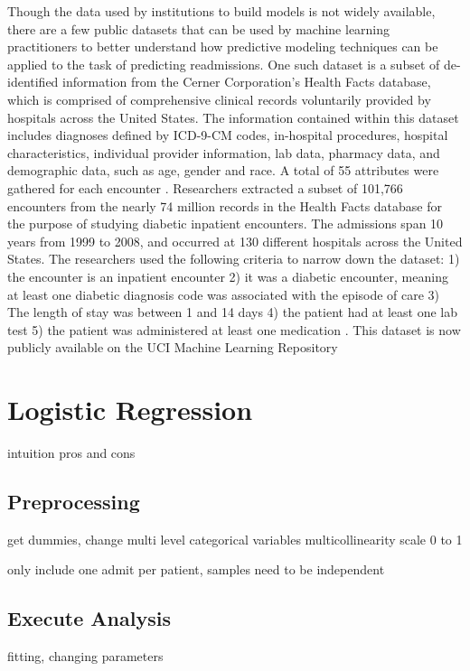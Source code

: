 \documentclass[sigconf]{acmart}
\begin{document}
Though the data used by institutions to build models is not widely available, there are a few public  datasets that can be used by machine learning practitioners to better understand how predictive modeling techniques can be applied to the task of predicting readmissions. One such dataset is a subset of de-identified information from the Cerner Corporation's Health Facts database, which is comprised of comprehensive clinical records voluntarily provided by hospitals across the United States. The information contained within this dataset includes diagnoses defined by ICD-9-CM codes, in-hospital procedures, hospital characteristics, individual provider information, lab data, pharmacy data, and demographic data, such as age, gender and race. A total of 55 attributes were gathered for each encounter \cite{cite11}.
Researchers extracted a subset of 101,766 encounters from the nearly 74 million records in the Health Facts database for the purpose of studying diabetic inpatient encounters. The admissions span 10 years from 1999 to 2008, and occurred at 130 different hospitals across the United States. The researchers used the following criteria to narrow down the dataset: 1) the encounter is an inpatient encounter 2) it was a diabetic encounter, meaning at least one diabetic diagnosis code was associated with the episode of care 3) The length of stay was between 1 and 14 days 4) the patient had at least one lab test 5) the patient was administered at least one medication \cite{cite11}. This dataset is now publicly available on the UCI Machine Learning Repository

\section{Logistic Regression}

intuition
pros and cons

\subsection{Preprocessing}
get dummies, change multi level categorical variables
multicollinearity
scale 0 to 1

only include one admit per patient, samples need to be independent

\subsection{Execute Analysis}
fitting, changing parameters
\end{document}
